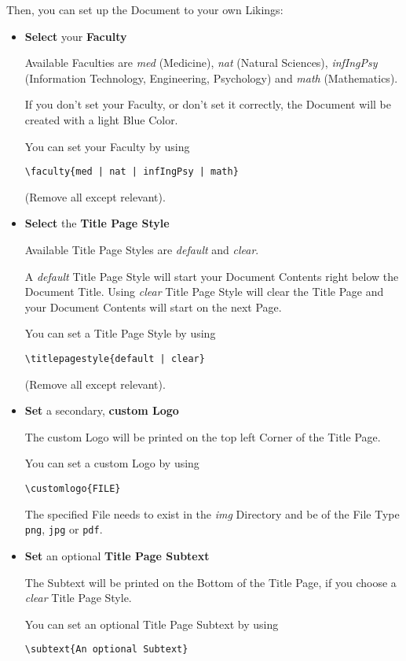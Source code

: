 \documentclass[a4paper]{../uulm-document}
\begin{document}
Then, you can set up the Document to your own Likings:
\begin{itemize}
\item \textbf{Select} your \textbf{Faculty}

Available Faculties are \textit{med} (Medicine), \textit{nat} (Natural Sciences), \textit{infIngPsy} (Information Technology, Engineering, Psychology) and \textit{math} (Mathematics). 

If you don't set your Faculty, or don't set it correctly, the Document will be created with a light Blue Color.

You can set your Faculty by using
\begin{lstlisting}
\faculty{med | nat | infIngPsy | math}
\end{lstlisting}
(Remove all except relevant).

\item \textbf{Select} the \textbf{Title Page Style}

Available Title Page Styles are \textit{default} and \textit{clear}.

A \textit{default} Title Page Style will start your Document Contents right below the Document Title. Using \textit{clear} Title Page Style will clear the Title Page and your Document Contents will start on the next Page.

You can set a Title Page Style by using
\begin{lstlisting}
\titlepagestyle{default | clear}
\end{lstlisting}
(Remove all except relevant).

\item \textbf{Set} a secondary, \textbf{custom Logo}

The custom Logo will be printed on the top left Corner of the Title Page.

You can set a custom Logo by using
\begin{lstlisting}
\customlogo{FILE}
\end{lstlisting}
The specified File needs to exist in the \textit{img} Directory and be of the File Type \texttt{png}, \texttt{jpg} or \texttt{pdf}.

\item \textbf{Set} an  optional \textbf{Title Page Subtext}

The Subtext will be printed on the Bottom of the Title Page, if you choose a \textit{clear} Title Page Style.

You can set an optional Title Page Subtext by using
\begin{lstlisting}
\subtext{An optional Subtext}
\end{lstlisting}


\end{itemize}
\end{document}
